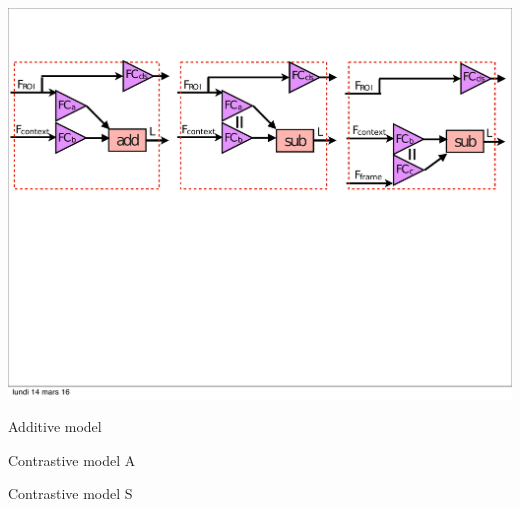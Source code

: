 \includegraphics[width=\textwidth, trim={2mm 11.5cm 2mm 3cm},
clip]{images/variants-horiz}\\ \begin{minipage}{0.31\linewidth} \centering
\small{Additive model} \end{minipage} \begin{minipage}{0.31\linewidth}
\centering \small{Contrastive model A} \end{minipage}
\begin{minipage}{0.31\linewidth} \centering \small{Contrastive model S}
\end{minipage}